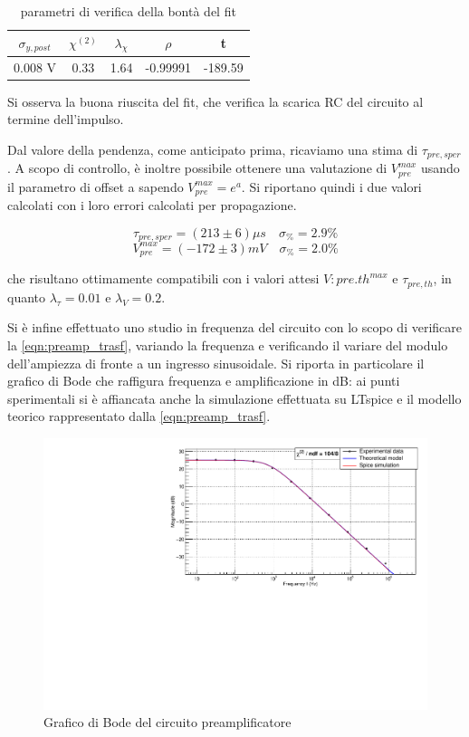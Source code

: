 \documentclass{article}
\begin{document}
\begin{table}[ht]
    \centering
    \begin{tabular}{ccccc}
        \toprule
        $\sigma_{y, post}$    &$\chi^{(2)}$    &$\lambda_{\chi}$   &$\rho$  &t   \\
        \midrule
        0.008 V               &0.33            &1.64              &-0.99991&-189.59\\
        \bottomrule
    \end{tabular}
    \caption{parametri di verifica della bontà del fit}
\end{table}

Si osserva la buona riuscita del fit, che verifica la scarica RC del circuito al termine dell'impulso.

Dal valore della pendenza, come anticipato prima, ricaviamo una stima di $\tau_{pre,sper}$. A scopo di controllo, è inoltre possibile 
ottenere una valutazione di $V_{pre}^{max}$ usando il parametro di offset a sapendo $V_{pre}^{max} = e^a$. Si riportano quindi i due
valori calcolati con i loro errori calcolati per propagazione.

\[
\tau_{pre,sper} = (213 \pm 6)\mu s \quad \sigma_{\%} = 2.9 \%    
\]
\[
V_{pre}^{max} = (-172 \pm 3)mV \quad \sigma_{\%} = 2.0 \%    
\]

che risultano ottimamente compatibili con i valori attesi $V:{pre.th}^{max}$ e $\tau_{pre,th}$, in quanto $\lambda_{\tau} = 0.01$
e $\lambda_{V}=0.2$.

Si è infine effettuato uno studio in frequenza del circuito con lo scopo di verificare la \ref{eqn:preamp_trasf}, variando la frequenza
e verificando il variare del modulo dell'ampiezza di fronte a un ingresso sinusoidale.
Si riporta in particolare il grafico di Bode che raffigura frequenza e amplificazione in dB: ai punti sperimentali si è affiancata
anche la simulazione effettuata su LTspice e il modello teorico rappresentato dalla \ref{eqn:preamp_trasf}.

\begin{center}
\begin{figure}[H]
\centering
\includegraphics[scale=0.4, angle=0]{bodepreamp.pdf}
\caption{Grafico di Bode del circuito preamplificatore}
\label{fig:bodepreamp}
\end{figure}
\end{center}
\end{document}
